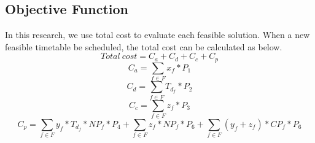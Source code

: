 \documentclass[senior]{IPSstyle}
\begin{document}
\subsection{Objective Function}
In this research, we use total cost to evaluate each feasible solution. When a new feasible timetable be scheduled, the total cost can be calculated as below.
\begin{equation}
    Total\ cost=C_a+C_d+C_c+C_p
\end{equation}
\begin{equation}
    C_a = \sum_{f\in F} x_{f}*P_1
\end{equation}
\begin{equation}
    C_d =\sum_{f\in F} T_{d_f}*P_2
\end{equation}
\begin{equation}
    C_c=\sum_{f\in F} z_{f}*P_3
\end{equation}
\begin{equation}
    C_p=\sum_{f\in F} y_f*T_{d_f}*NP_f*P_4+\sum_{f\in F} z_f*NP_f*P_6+\sum_{f\in F} (y_f+z_f)*CP_f*P_6
\end{equation}
\end{document}

